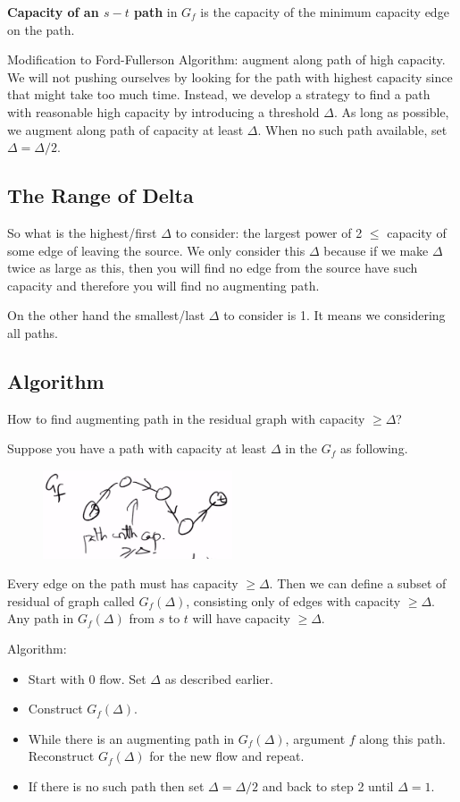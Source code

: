 \begin{definition}
	\textbf{Capacity of an $s-t$ path} in $G_f$ is the capacity of the minimum capacity edge on the path.
\end{definition}

Modification to Ford-Fullerson Algorithm: augment along path of high capacity. We will not pushing ourselves by looking for the path with highest capacity since that might take too much time. Instead, we develop a strategy to find a path with reasonable high capacity by introducing a threshold $\Delta$. As long as possible, we augment along path of capacity at least $\Delta$. When no such path available, set $\Delta = \Delta / 2$.
\subsection{The Range of Delta}
So what is the highest/first $\Delta$ to consider: the largest power of 2 $\le$ capacity of some edge of leaving the source. We only consider this $\Delta$ because if we make $\Delta$ twice as large as this, then you will find no edge from the source have such capacity and therefore you will find no augmenting path.

On the other hand the smallest/last $\Delta$ to consider is 1. It means we considering all paths.
\subsection{Algorithm}
How to find augmenting path in the residual graph with capacity $\ge \Delta$?

Suppose you have a path with capacity at least $\Delta$ in the $G_f$ as following. 
\begin{figure}[H]
	\centering
	\includegraphics[width=0.5\textwidth]{fig/path-gf.png}
\end{figure}
Every edge on the path must has capacity $\ge \Delta$. Then we can define a subset of residual of graph called $G_f(\Delta)$, consisting only of edges with capacity $\ge \Delta$. Any path in $G_f(\Delta)$ from $s$ to $t$ will have capacity $\ge \Delta$.

Algorithm:
\begin{itemize}
	\item Start with 0 flow. Set $\Delta$ as described earlier. 
	\item Construct $G_f(\Delta)$.
	\item While there is an augmenting path in $G_f(\Delta)$, argument $f$ along this path. Reconstruct $G_f(\Delta)$ for the new flow and repeat.
	\item If there is no such path then set $\Delta = \Delta / 2$ and back to step 2 until $\Delta = 1$.
\end{itemize}

